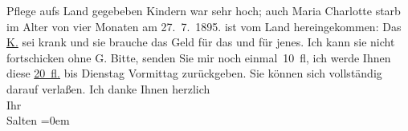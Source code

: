 \begin{ledgroupsized}[t]{13cm}
{{{                  Pflege aufs Land gegebeben Kindern war sehr hoch; auch Maria Charlotte starb im Alter von vier Monaten am 27. 7. 1895.}}}\label{K_L03156-1h} ist vom Land hereingekommen: Das
                  \uline{K.} sei krank und sie brauche das Geld für das und für jenes. Ich kann sie nicht
               fortschicken ohne G. Bitte, senden Sie mir noch einmal 10 fl, ich {\pb}werde Ihnen diese \uline{20 fl.} bis Dienstag{ }Vormittag{ } zurückgeben. Sie können sich vollständig
               darauf verlaßen. Ich danke Ihnen \pend
           \pstart
           herzlich {\\[\baselineskip]}Ihr {\\[\baselineskip]}\spacefill\mbox{Salten}\pend
           \leftskip=0em{}
         
         \endnumbering{}\end{ledgroupsized}  \newcommand{\dateiname}{L03156}\newcommand{\titel}{Felix Salten an Arthur Schnitzler, [9. 6. 1895]}\newcommand{\editorInnen}{Martin Anton Müller und Laura Untner}
      